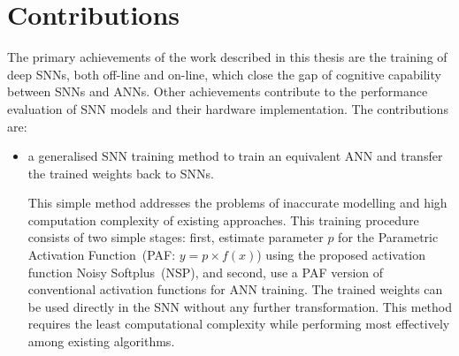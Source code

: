 \section{Contributions}
The primary achievements of the work described in this thesis are the training of deep SNNs, both off-line and on-line, which close the gap of cognitive capability between SNNs and ANNs.
Other achievements contribute to the performance evaluation of SNN models and their hardware implementation.
The contributions are:
\begin{itemize}
%	
	
	\item 
	a generalised SNN training method to train an equivalent ANN and transfer the trained weights back to SNNs.
	
	This simple method addresses the problems of inaccurate modelling and high computation complexity of existing approaches.
	This training procedure consists of two simple stages: first, estimate parameter $p$ for the Parametric Activation Function~(PAF: $y = p \times f(x)$) using the proposed activation function Noisy Softplus~(NSP), and second, use a PAF version of conventional activation functions for ANN training. %
	The trained weights can be used directly in the SNN without any further transformation.
	This method requires the least computational complexity while performing most effectively among existing algorithms.



\end{itemize}
